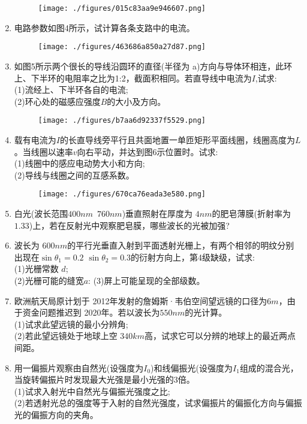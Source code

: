 \begin{enumerate}
\begin{figure}[ht]
\centering
\texttt{[image: ./figures/015c83aa9e946607.png]}
\caption{} \label{fig_SD15_1}
\end{figure}
\item 电路参数如图4所示，试计算各条支路中的电流。
\begin{figure}[ht]
\centering
\texttt{[image: ./figures/463686a850a27d87.png]}
\caption{} \label{fig_SD15_4}
\end{figure}
\item 如图5所示两个很长的导线沿圆环的直径(半径为 a)方向与导体环相连，此环上、下半环的电阻率之比为1:2，截面积相同。若直导线中电流为$I$,试求:\\
(1)流经上、下半环各自的电流;\\
(2)环心处的磁感应强度$ B$的大小及方向。
\begin{figure}[ht]
\centering
\texttt{[image: ./figures/b7aa6d92337f5529.png]}
\caption{} \label{fig_SD15_5}
\end{figure}
\item 载有电流为$I$的长直导线旁平行且共面地置一单匝矩形平面线圈，线圈高度为$L$。当线圈以速率$v$向右平动，并达到图6示位置时。试求:\\
(1)线圈中的感应电动势大小和方向;\\
(2)导线与线圈之间的互感系数。
\begin{figure}[ht]
\centering
\texttt{[image: ./figures/670ca76eada3e580.png]}
\caption{} \label{fig_SD15_6}
\end{figure}
\item 白光(波长范围$400nm$~$760nm$)垂直照射在厚度为 $4nm $的肥皂薄膜(折射率为$1.33$)上，若在反射光中观察肥皂膜，哪些波长的光被加强?
\item 波长为 $600nm $的平行光垂直入射到平面透射光栅上，有两个相邻的明纹分别出现在$\sin \theta_1=0.2$ $\sin \theta_2=0.3$的衍射方向上，第4级缺级，试求:\\
(1)光栅常数 $d$;\\
(2)光栅可能的缝宽$a$:
(3)屏上可能呈现的全部级数。
\item 欧洲航天局原计划于 2012年发射的詹姆斯·韦伯空间望远镜的口径为$ 6m$，由于资金问题推迟到 2020年。若以波长为$550nm$的光计算。\\
(1)试求此望远镜的最小分辨角;\\
(2)若此望远镜处于地球上空 $340km $高，试求它可以分辨的地球上的最近两点间距。
\item 用一偏振片观察由自然光(设强度为$I_0$)和线偏振光(设强度为$I_1$组成的混合光，当旋转偏振片时发现最大光强是最小光强的3倍。\\
(1)试求入射光中自然光与偏振光强度之比;\\
(2)若透射光总的强度等于入射的自然光强度，试求偏振片的偏振化方向与偏振光的偏振方向的夹角。
\end{enumerate}